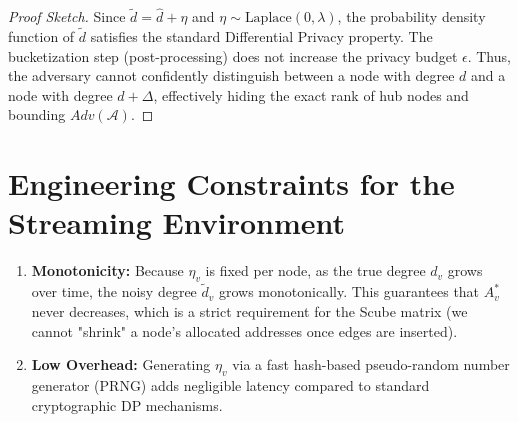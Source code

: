 \documentclass[11pt,a4paper]{article}
\begin{document}
\begin{proof}[Proof Sketch]
Since $\tilde{d} = \hat{d} + \eta$ and $\eta \sim \text{Laplace}(0, \lambda)$, the probability density function of $\tilde{d}$ satisfies the standard Differential Privacy property. The bucketization step (post-processing) does not increase the privacy budget $\epsilon$. Thus, the adversary cannot confidently distinguish between a node with degree $d$ and a node with degree $d + \Delta$, effectively hiding the exact rank of hub nodes and bounding $Adv(\mathcal{A})$.
\end{proof}

\section{Engineering Constraints for the Streaming Environment}

\begin{enumerate}
    \item \textbf{Monotonicity:} Because $\eta_v$ is fixed per node, as the true degree $d_v$ grows over time, the noisy degree $\tilde{d}_v$ grows monotonically. This guarantees that $A_v^*$ never decreases, which is a strict requirement for the Scube matrix (we cannot "shrink" a node's allocated addresses once edges are inserted).
    \item \textbf{Low Overhead:} Generating $\eta_v$ via a fast hash-based pseudo-random number generator (PRNG) adds negligible latency compared to standard cryptographic DP mechanisms.
\end{enumerate}
\end{document}
